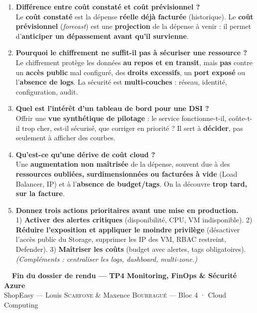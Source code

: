\documentclass[11pt,a4paper]{article}
\newcommand{\emo}[1]{\raisebox{-0.14em}{\twemoji{#1}}}
\newcommand{\eParty}{\emo{1f389}}
\begin{document}
\begin{enumerate}[leftmargin=2.2em]
\item \textbf{Différence entre coût constaté et coût prévisionnel ?}\\ Le \textbf{coût constaté} est la dépense \textbf{réelle déjà facturée} (historique). Le \textbf{coût prévisionnel} (\textit{forecast}) est une \textbf{projection} de la dépense à venir : il permet d'\textbf{anticiper un dépassement avant qu'il survienne}.
\item \textbf{Pourquoi le chiffrement ne suffit-il pas à sécuriser une ressource ?}\\ Le chiffrement protège les données \textbf{au repos et en transit}, mais \textbf{pas} contre un \textbf{accès public} mal configuré, des \textbf{droits excessifs}, un \textbf{port exposé} ou l'\textbf{absence de logs}. La sécurité est \textbf{multi-couches} : réseau, identité, configuration, audit.
\item \textbf{Quel est l'intérêt d'un tableau de bord pour une DSI ?}\\ Offrir une \textbf{vue synthétique de pilotage} : le service fonctionne-t-il, coûte-t-il trop cher, est-il sécurisé, que corriger en priorité ? Il sert à \textbf{décider}, pas seulement à afficher des courbes.
\item \textbf{Qu'est-ce qu'une dérive de coût cloud ?}\\ Une \textbf{augmentation non maîtrisée} de la dépense, souvent due à des \textbf{ressources oubliées, surdimensionnées ou facturées à vide} (Load Balancer, IP) et à l'\textbf{absence de budget/tags}. On la découvre \textbf{trop tard, sur la facture}.
\item \textbf{Donnez trois actions prioritaires avant une mise en production.}\\ 1) \textbf{Activer des alertes critiques} (disponibilité, CPU, VM indisponible). 2) \textbf{Réduire l'exposition et appliquer le moindre privilège} (désactiver l'accès public du Storage, supprimer les IP des VM, RBAC restreint, Defender). 3) \textbf{Maîtriser les coûts} (budget avec alertes, tags obligatoires). \textit{(Compléments : centraliser les logs, dashboard, multi-zone.)}
\end{enumerate}

\vspace{6mm}
\begin{center}
{\sffamily\bfseries\large\color{azuredark}\eParty~~Fin du dossier de rendu — TP4 Monitoring, FinOps \& Sécurité Azure}\\[2mm]
{\color{black!55}ShopEasy — Louis \textsc{Scarfone} \& Maxence \textsc{Bourragué} — Bloc 4 · Cloud Computing}
\end{center}
\end{document}
